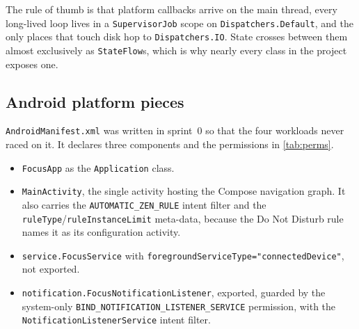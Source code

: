 \documentclass[10pt,a4paper]{article}
\newcommand{\file}[1]{\texttt{\small #1}}          %
\newcommand{\code}[1]{\texttt{#1}}                  %
\begin{document}
The rule of thumb is that platform callbacks arrive on the main thread, every long-lived loop
lives in a \code{SupervisorJob} scope on \code{Dispatchers.Default}, and the only places that
touch disk hop to \code{Dispatchers.IO}. State crosses between them almost exclusively as
\code{StateFlow}s, which is why nearly every class in the project exposes one.

\subsection{Android platform pieces}

\file{AndroidManifest.xml} was written in sprint~0 so that the four workloads never raced on it.
It declares three components and the permissions in \cref{tab:perms}.

\begin{itemize}
\item \code{FocusApp} as the \code{Application} class.
\item \code{MainActivity}, the single activity hosting the Compose navigation graph. It also
  carries the \code{AUTOMATIC\_ZEN\_RULE} intent filter and the
  \code{ruleType}/\code{ruleInstanceLimit} meta-data, because the Do Not Disturb rule names it as
  its configuration activity.
\item \code{service.FocusService} with \code{foregroundServiceType="connectedDevice"}, not
  exported.
\item \code{notification.FocusNotificationListener}, exported, guarded by the system-only
  \code{BIND\_NOTIFICATION\_\allowbreak LISTENER\_SERVICE} permission, with the
  \code{NotificationListenerService} intent filter.
\end{itemize}
\end{document}
